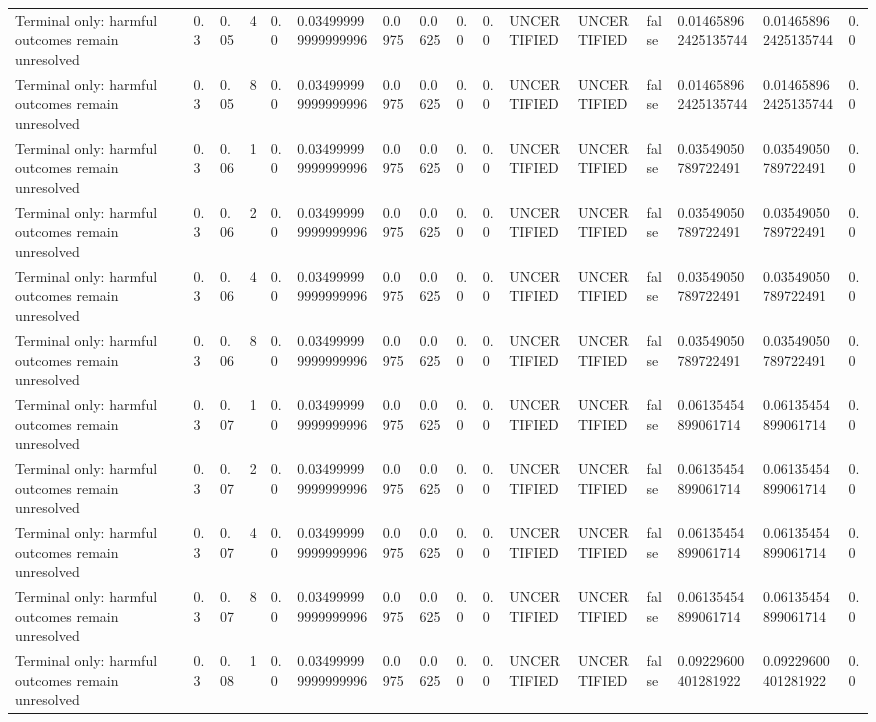 \begin{tabular}{llllllllllllllll}
Terminal only: harmful outcomes remain unresolved & 0.3 & 0.05 & 4 & 0.0 & 0.034999999999999996 & 0.0975 & 0.0625 & 0.0 & 0.0 & UNCERTIFIED & UNCERTIFIED & false & 0.014658962425135744 & 0.014658962425135744 & 0.0 \\
Terminal only: harmful outcomes remain unresolved & 0.3 & 0.05 & 8 & 0.0 & 0.034999999999999996 & 0.0975 & 0.0625 & 0.0 & 0.0 & UNCERTIFIED & UNCERTIFIED & false & 0.014658962425135744 & 0.014658962425135744 & 0.0 \\
Terminal only: harmful outcomes remain unresolved & 0.3 & 0.06 & 1 & 0.0 & 0.034999999999999996 & 0.0975 & 0.0625 & 0.0 & 0.0 & UNCERTIFIED & UNCERTIFIED & false & 0.03549050789722491 & 0.03549050789722491 & 0.0 \\
Terminal only: harmful outcomes remain unresolved & 0.3 & 0.06 & 2 & 0.0 & 0.034999999999999996 & 0.0975 & 0.0625 & 0.0 & 0.0 & UNCERTIFIED & UNCERTIFIED & false & 0.03549050789722491 & 0.03549050789722491 & 0.0 \\
Terminal only: harmful outcomes remain unresolved & 0.3 & 0.06 & 4 & 0.0 & 0.034999999999999996 & 0.0975 & 0.0625 & 0.0 & 0.0 & UNCERTIFIED & UNCERTIFIED & false & 0.03549050789722491 & 0.03549050789722491 & 0.0 \\
Terminal only: harmful outcomes remain unresolved & 0.3 & 0.06 & 8 & 0.0 & 0.034999999999999996 & 0.0975 & 0.0625 & 0.0 & 0.0 & UNCERTIFIED & UNCERTIFIED & false & 0.03549050789722491 & 0.03549050789722491 & 0.0 \\
Terminal only: harmful outcomes remain unresolved & 0.3 & 0.07 & 1 & 0.0 & 0.034999999999999996 & 0.0975 & 0.0625 & 0.0 & 0.0 & UNCERTIFIED & UNCERTIFIED & false & 0.06135454899061714 & 0.06135454899061714 & 0.0 \\
Terminal only: harmful outcomes remain unresolved & 0.3 & 0.07 & 2 & 0.0 & 0.034999999999999996 & 0.0975 & 0.0625 & 0.0 & 0.0 & UNCERTIFIED & UNCERTIFIED & false & 0.06135454899061714 & 0.06135454899061714 & 0.0 \\
Terminal only: harmful outcomes remain unresolved & 0.3 & 0.07 & 4 & 0.0 & 0.034999999999999996 & 0.0975 & 0.0625 & 0.0 & 0.0 & UNCERTIFIED & UNCERTIFIED & false & 0.06135454899061714 & 0.06135454899061714 & 0.0 \\
Terminal only: harmful outcomes remain unresolved & 0.3 & 0.07 & 8 & 0.0 & 0.034999999999999996 & 0.0975 & 0.0625 & 0.0 & 0.0 & UNCERTIFIED & UNCERTIFIED & false & 0.06135454899061714 & 0.06135454899061714 & 0.0 \\
Terminal only: harmful outcomes remain unresolved & 0.3 & 0.08 & 1 & 0.0 & 0.034999999999999996 & 0.0975 & 0.0625 & 0.0 & 0.0 & UNCERTIFIED & UNCERTIFIED & false & 0.09229600401281922 & 0.09229600401281922 & 0.0 \\

\end{tabular}
